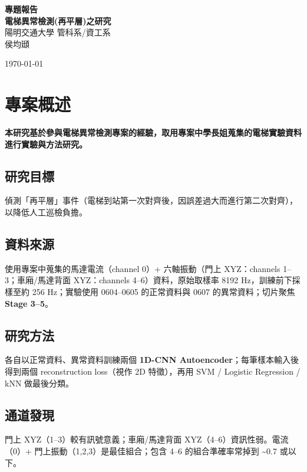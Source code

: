 \documentclass[12pt,a4paper]{article}
\begin{document}
\begin{titlepage}
    \centering
    \vspace*{2cm}
    
    {\Huge\bfseries 專題報告}\\[0.5cm]
    {\huge\bfseries 電梯異常檢測(再平層)之研究}\\[2cm]
    
    {\Large 陽明交通大學 管科系/資工系}\\[0.5cm]
    {\Large 侯均頲}\\[3cm]
    
    \vfill
    
    {\large \today}
\end{titlepage}

\tableofcontents
\newpage

\section{專案概述}

\textbf{本研究基於參與電梯異常檢測專案的經驗，取用專案中學長姐蒐集的電梯實驗資料進行實驗與方法研究。}

\subsection{研究目標}
偵測「再平層」事件（電梯到站第一次對齊後，因誤差過大而進行第二次對齊），以降低人工巡檢負擔。

\subsection{資料來源}
使用專案中蒐集的馬達電流（channel 0）+ 六軸振動（門上 XYZ：channels 1–3；車廂/馬達背面 XYZ：channels 4–6）資料，原始取樣率 8192 Hz，訓練前下採樣至約 256 Hz；實驗使用 0604–0605 的正常資料與 0607 的異常資料；切片聚焦 \textbf{Stage 3–5}。

\subsection{研究方法}
各自以正常資料、異常資料訓練兩個 \textbf{1D-CNN Autoencoder}；每筆樣本輸入後得到兩個 reconstruction loss（視作 2D 特徵），再用 SVM / Logistic Regression / kNN 做最後分類。

\subsection{通道發現}
門上 XYZ（1–3）較有訊號意義；車廂/馬達背面 XYZ（4–6）資訊性弱。電流（0）+ 門上振動（1,2,3）是最佳組合；包含 4–6 的組合準確率常掉到 \textasciitilde 0.7 或以下。
\end{document}

